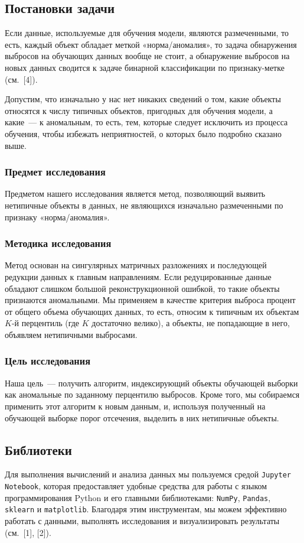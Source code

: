 \documentclass[a4paper,12pt]{article}
\begin{document}
\subsection{Постановки задачи}

Если данные, используемые для обучения модели, являются размеченными, то есть, каждый объект  обладает меткой «норма/аномалия», то задача обнаружения выбросов на обучающих данных вообще не стоит, а обнаружение выбросов на новых данных сводится к задаче бинарной классификации по признаку-метке (см. [4]).

Допустим, что изначально у нас нет никаких сведений о том, какие объекты относятся к числу типичных объектов, пригодных для обучения модели, а какие — к аномальным, то есть, тем, которые следует исключить из процесса обучения, чтобы избежать неприятностей, о которых было подробно сказано выше.

\subsubsection{Предмет исследования} Предметом нашего исследования является метод, позволяющий выявить нетипичные объекты в данных, не являющихся изначально размеченными по признаку «норма/аномалия». 

\subsubsection{Методика исследования} Метод основан на сингулярных матричных разложениях и последующей редукции данных к главным направлениям. Если редуцированные данные обладают слишком большой реконструкционной ошибкой, то такие объекты признаются аномальными. Мы применяем в качестве критерия выброса процент от общего объема обучающих данных, то есть, относим к типичным их объектам $K$-й перцентиль (где $K$ достаточно велико), а объекты, не попадающие в него, объявляем нетипичными выбросами.

\subsubsection{Цель исследования} Наша цель — получить алгоритм, индексирующий объекты обучающей выборки как аномальные по заданному перцентилю выбросов. Кроме того, мы собираемся применить этот алгоритм к новым данным, и, используя полученный на обучающей выборке порог отсечения, выделить в них нетипичные объекты.

\subsection{Библиотеки}
Для выполнения вычислений и анализа данных мы пользуемся средой \texttt{Jupyter Notebook}, которая предоставляет удобные средства для работы с языком программирования Python и его главными библиотеками: \texttt{NumPy}, \texttt{Pandas}, \texttt{sklearn} и \texttt{matplotlib}. Благодаря этим инструментам, мы можем эффективно работать с данными, выполнять исследования и визуализировать результаты (см. [1], [2]). 
\end{document}
